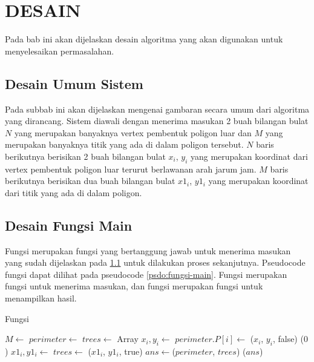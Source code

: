 \chapter{DESAIN}
\label{sec:desain}
Pada bab ini akan dijelaskan desain algoritma yang akan digunakan untuk menyelesaikan permasalahan.

\section{Desain Umum Sistem}
\label{sec:desain-umum-sistem}
Pada subbab ini akan dijelaskan mengenai gambaran secara umum dari algoritma yang dirancang. Sistem diawali dengan menerima masukan 2 buah bilangan bulat $N$ yang merupakan banyaknya vertex pembentuk poligon luar dan $M$ yang merupakan banyaknya titik yang ada di dalam poligon tersebut. $N$ baris berikutnya berisikan 2 buah bilangan bulat $x_i$, $y_i$ yang merupakan koordinat dari vertex pembentuk poligon luar terurut berlawanan arah jarum jam. $M$ baris berikutnya berisikan dua buah bilangan bulat $x1_i$, $y1_i$ yang merupakan koordinat dari titik yang ada di dalam poligon.

\section{Desain Fungsi Main}
Fungsi  merupakan fungsi yang bertanggung jawab untuk menerima masukan yang sudah dijelaskan pada \ref{sec:desain-umum-sistem} untuk dilakukan proses sekanjutnya. Pseudocode fungsi  dapat dilihat pada pseudocode \ref{psdo:fungsi-main}. Fungsi  merupakan fungsi untuk menerima masukan, dan fungsi  merupakan fungsi untuk menampilkan hasil. 

\begin{algorithm}
	\caption{Fungsi }
	\label{psdo:fungsi-main}
    \begin{algorithmic}[1]
            \State $M \leftarrow$ 
            \State $perimeter \leftarrow$ 
            \State $trees \leftarrow$ Array    
                \State $x_i , y_i \leftarrow $ 
                \State $perimeter.P[i]\leftarrow$ ($x_i$, $y_i$, false)
			\EndFor
				\State {}($0$)
				\State {}
			\EndIf
                \State $ x1_i , y1_i \leftarrow $ 
                \State $trees \leftarrow$ ($x1_i$, $y1_i$, true)
            \EndFor
            \State $ans \leftarrow $($perimeter$, $trees$)
            \State {} ($ans $)
        \EndWhile
	\end{algorithmic}
\end{algorithm}
